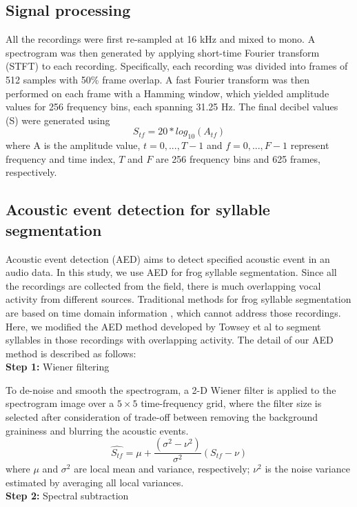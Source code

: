\subsection{Signal processing}
All the recordings were first re-sampled at 16 kHz and mixed to mono. A spectrogram was then generated by applying short-time Fourier transform (STFT) to each recording. Specifically, each recording was
divided into frames of 512 samples with 50\% frame overlap.
A fast Fourier transform was then performed on each frame with a Hamming window, which yielded amplitude values for 256 frequency bins, each spanning 31.25 Hz. The final
decibel values (S) were generated using 
\begin{equation}
S_{tf} = 20*log_{10}(A_{tf})
\end{equation}
where A is the amplitude value, $t=0,...,T-1$ and $f=0,...,F-1$ represent frequency and time index, $T$ and $F$ are 256 frequency bins and 625 frames, respectively. 

\subsection{Acoustic event detection for syllable segmentation}
Acoustic event detection (AED) aims to detect specified acoustic event in an audio data. In this study, we use AED for frog syllable segmentation. Since all the recordings are collected from the field, there is much overlapping vocal activity from different sources. Traditional methods for frog syllable segmentation are based on time domain information \cite{somervuo2004classification,huang2009frog}, which cannot address those recordings. Here, we modified the AED method developed by Towsey et al \cite{towsey2012toolbox} to segment syllables in those recordings with overlapping activity. The detail of our AED method is described as follows:
\\
\textbf{Step 1:} Wiener filtering 

\noindent To de-noise and smooth the spectrogram, a 2-D Wiener filter is applied to the spectrogram image over a $5 \times 5$ time-frequency grid, where the filter size is selected after consideration of trade-off between removing the background graininess and blurring the acoustic events.
\begin{equation}
\hat{S_{tf}} = \mu + \frac{(\sigma^{2}-\nu^{2})}{\sigma^{2}}(S_{tf}-\nu)
\end{equation}
where $\mu$ and $\sigma^{2}$ are local mean and variance, respectively; $\nu^{2}$ is the noise variance estimated by averaging all local variances. 
\\
\textbf{Step 2:} Spectral subtraction


